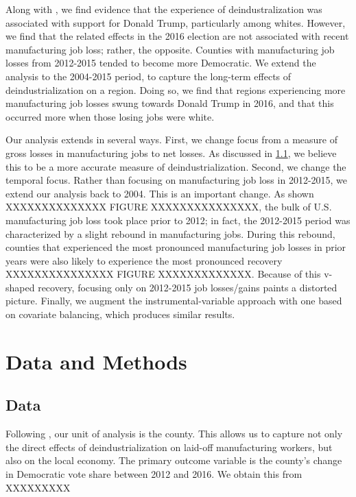 \documentclass[]{AEA}
\begin{document}
Along with \cite{Baccini21}, we find evidence that the experience of
deindustralization was associated with support for Donald Trump,
particularly among whites. However, we find that the related effects in
the 2016 election are not associated with recent manufacturing job loss;
rather, the opposite. Counties with manufacturing job losses from
2012-2015 tended to become more Democratic. We extend the analysis to
the 2004-2015 period, to capture the long-term effects of
deindustrialization on a region. Doing so, we find that regions
experiencing more manufacturing job losses swung towards Donald Trump in
2016, and that this occurred more when those losing jobs were white.

Our analysis extends \cite{Baccini21} in several ways. First, we change
focus from a measure of gross losses in manufacturing jobs to net
losses. As discussed in \ref{datasec}, we believe this to be a more
accurate measure of deindustrialization. Second, we change the temporal
focus. Rather than focusing on manufacturing job loss in 2012-2015, we
extend our analysis back to 2004. This is an important change. As shown
XXXXXXXXXXXXXX FIGURE XXXXXXXXXXXXXXX, the bulk of U.S. manufacturing
job loss took place prior to 2012; in fact, the 2012-2015 period was
characterized by a slight rebound in manufacturing jobs. During this
rebound, counties that experienced the most pronounced manufacturing job
losses in prior years were also likely to experience the most pronounced
recovery XXXXXXXXXXXXXXX FIGURE XXXXXXXXXXXXX. Because of this v-shaped
recovery, focusing only on 2012-2015 job losses/gains paints a distorted
picture. Finally, we augment the instrumental-variable approach with one
based on covariate balancing, which produces similar results.

\section{Data and Methods} 
\label{datamethods}

\subsection{Data} 
\label{datasec}

Following \cite{Baccini21}, our unit of analysis is the county. This
allows us to capture not only the direct effects of deindustrialization
on laid-off manufacturing workers, but also on the local economy. The
primary outcome variable is the county's change in Democratic vote share
between 2012 and 2016. We obtain this from XXXXXXXXX
\end{document}
